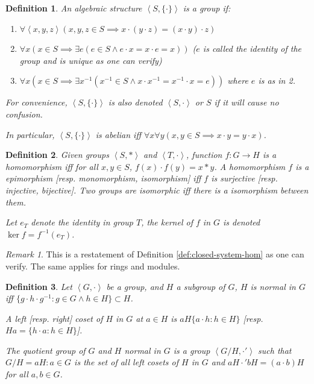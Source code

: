 \documentclass{book}
\newtheorem{definition}{Definition}
\theoremstyle{definition}\newtheorem{mechanism}{Mechanism}
\theoremstyle{remark}\newtheorem*{remark}{Remark}
\begin{document}
\begin{definition}
	An algebraic structure $\left<S, \{\cdot\}\right>$ is a group if:
	\begin{enumerate}
		\item $\forall\left<x,y,z\right>(x, y, z\in S\implies x\cdot (y\cdot z) = (x\cdot y)\cdot z)$
		\item $\forall x (x\in S\implies\exists e(e\in S\land e\cdot x = x\cdot e = x))$ ($e$ is called the identity of the group and is unique as one can verify)
		\item $\forall x\left(x\in S\implies \exists x^{-1}(x^{-1}\in S\land x\cdot x^{-1} = x^{-1}\cdot x = e)\right)$ where $e$ is as in 2.
	\end{enumerate}
	For convenience, $\left<S, \{\cdot\}\right>$ is also denoted $\left<S, \cdot\right>$ or $S$ if it will cause no confusion. 
	
	In particular, $\left<S, \{\cdot\}\right>$ is abelian iff $\forall x\forall y(x, y\in S\implies x\cdot y = y\cdot x)$.
\end{definition}

\begin{definition}
	Given groups $\left<S, *\right>$ and $\left<T, \cdot\right>$, function $f: G\to H$ is a homomorphism iff for all $x, y\in S$, $f(x)\cdot f(y) = x*y$. A homomorphism $f$ is a epimorphism [resp. monomorphism, isomorphism] iff $f$ is surjective [resp. injective, bijective]. Two groups are isomorphic iff there is a isomorphism between them.
	
	Let $e_T$ denote the identity in group $T$, the kernel of $f$ in $G$ is denoted $\ker f = f^{-1}(e_T)$.
\end{definition}

\begin{remark}
	This is a restatement of Definition \ref{def:closed-system-hom} as one can verify. The same applies for rings and modules.
\end{remark}

\begin{definition}
	Let $\left<G, \cdot\right>$ be a group, and $H$ a subgroup of $G$, $H$ is normal in $G$ iff $\{g \cdot h\cdot g^{-1}: g\in G\land h\in H\}\subset H$. 
	
	A left [resp. right] coset of $H$ in $G$ at $a\in H$ is $aH\{a\cdot h: h\in H\}$ [resp. $Ha = \{h\cdot a: h\in H\}$].
	
	The quotient group of $G$ and $H$ normal in $G$ is a group $\left<G / H, \cdot'\right>$ such that $G / H = {aH: a\in G}$ is the set of all left cosets of $H$ in $G$ and $aH\cdot' bH = (a\cdot b)H$ for all $a, b \in G$.
\end{definition}
\end{document}
